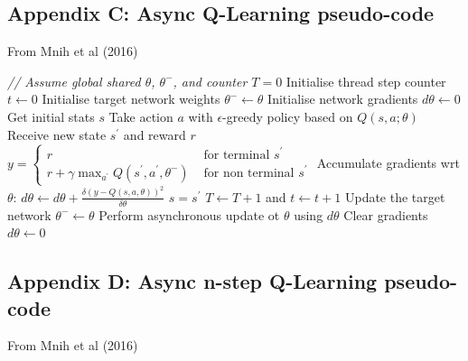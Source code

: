 \documentclass{article}
\begin{document}
\subsection*{Appendix C: Async Q-Learning pseudo-code}
\label{async_q_pseudo}

From Mnih et al (2016)

\begin{algorithmic}[1]
\State \textit{// Assume global shared  $\theta$, $\theta^{-}$, and counter $T = 0$}
\State Initialise thread step counter $t \gets 0$
\State Initialise target network weights $\theta^{-} \gets \theta$
\State Initialise network gradients $d\theta \gets 0$
\State Get initial stats $s$
    \State Take action $a$ with $\epsilon$-greedy policy based on $Q\left(s,a;\theta\right)$
    \State Receive new state $s^{\prime}$ and reward $r$
    \State $y= \begin{cases}r & \text { for terminal } s^{\prime} \\ r + \gamma \max _{a^{\prime}} Q\left(s^{\prime}, a^{\prime}, \theta^{-}\right) & \text { for non terminal } s^{\prime}\end{cases}$
    \State Accumulate gradients wrt $\theta$: $d\theta \gets d\theta + \frac{\delta\left( y-Q\left(s, a, \theta\right)\right)^{2}}{\delta\theta}$
    \State $s = s^{\prime}$
    \State $T \gets T + 1$ and $t \gets t + 1$
        \State Update the target network $\theta^{-} \gets \theta$
    \EndIf
        \State Perform asynchronous update ot $\theta$ using $d\theta$
        \State Clear gradients $d\theta \gets 0$
    \EndIf
\EndWhile

\end{algorithmic}

\subsection*{Appendix D: Async n-step Q-Learning pseudo-code}
\label{async_q_n_step_pseudo}

From Mnih et al (2016)
\end{document}
